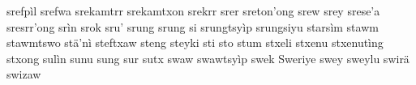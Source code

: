 srefpìl\hspace{2mm}
srefwa\hspace{2mm}
srekamtrr\hspace{2mm}
srekamtxon\hspace{2mm}
srekrr\hspace{2mm}
srer\hspace{2mm}
sreton'ong\hspace{2mm}
srew\hspace{2mm}
srey\hspace{2mm}
srese'a\hspace{2mm}
sresrr'ong\hspace{2mm}
srìn\hspace{2mm}
srok\hspace{2mm}
sru'\hspace{2mm}
srung\hspace{2mm}
srung si\hspace{2mm}
srungtsyìp\hspace{2mm}
srungsiyu\hspace{2mm}
starsìm\hspace{2mm}
stawm\hspace{2mm}
stawmtswo\hspace{2mm}
stä'nì\hspace{2mm}
steftxaw\hspace{2mm}
steng\hspace{2mm}
steyki\hspace{2mm}
sti\hspace{2mm}
sto\hspace{2mm}
stum\hspace{2mm}
stxeli\hspace{2mm}
stxenu\hspace{2mm}
stxenutìng\hspace{2mm}
stxong\hspace{2mm}
sulìn\hspace{2mm}
sunu\hspace{2mm}
sung\hspace{2mm}
sur\hspace{2mm}
sutx\hspace{2mm}
swaw\hspace{2mm}
swawtsyìp\hspace{2mm}
swek\hspace{2mm}
Sweriye\hspace{2mm}
swey\hspace{2mm}
sweylu\hspace{2mm}
swirä\hspace{2mm}
swizaw\hspace{2mm}
